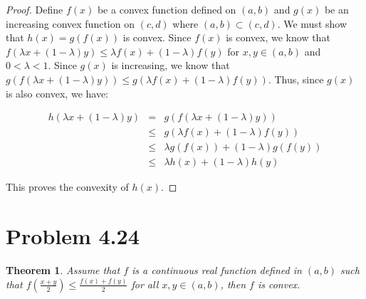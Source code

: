 \documentclass[psamsfonts]{amsart}
\newtheorem{thm}{Theorem}[section]
\theoremstyle{definition}
\theoremstyle{remark}
\numberwithin{equation}{section}
\begin{document}
\begin{proof}
Define $f(x)$ be a convex function defined on $(a,b)$ and $g(x)$ be an increasing convex function on $(c,d)$ where $(a,b) \subset (c,d)$. We must show that $h(x) = g(f(x))$ is convex. Since $f(x)$ is convex, we know that $f(\lambda x + (1 - \lambda) y) \leq \lambda f(x) + ( 1 - \lambda) f(y)$ for $x,y \in (a,b)$ and $0 < \lambda < 1$. Since $g(x)$ is increasing, we know that $g(f(\lambda x + (1 - \lambda) y)) \leq g(\lambda f(x) + ( 1 - \lambda) f(y))$. Thus, since $g(x)$ is also convex, we have:

\begin{eqnarray}
h(\lambda x + (1 - \lambda) y) &=& g(f(\lambda x + (1 - \lambda) y)) \\
& \leq & g(\lambda f(x) + ( 1 - \lambda) f(y)) \\
& \leq & \lambda g(f(x)) + (1 - \lambda) g(f(y)) \\
& \leq & \lambda h(x) + (1 - \lambda) h(y) 
\end{eqnarray}

This proves the convexity of $h(x)$. 
\end{proof}

\section{Problem 4.24}

\begin{thm}
Assume that $f$ is a continuous real function defined in $(a,b)$ such that $f( \frac{x +y}{2}) \leq \frac{ f(x) + f(y)}{2}$ for all $x,y \in (a,b)$, then $f$ is convex. 
\end{thm}
\end{document}

